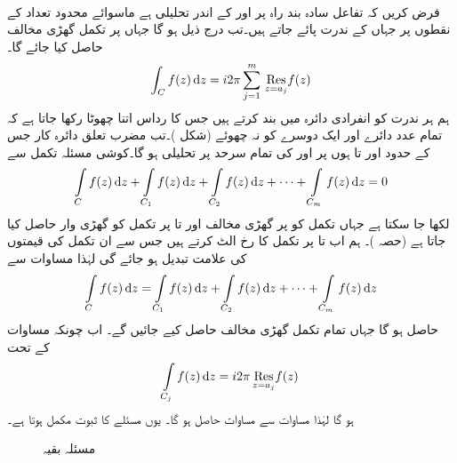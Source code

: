 \quad {}\\
فرض کریں کہ تفاعل  سادہ بند راہ  پر اور  کے اندر  تحلیلی ہے ماسوائے محدود تعداد کے نقطوں  پر جہاں  کے ندرت پائے جاتے ہیں۔تب درج ذیل ہو گا جہاں  پر تکمل گھڑی مخالف  حاصل کیا جائے گا۔
\begin{align}\label{مساوات_بقیہ_مسئلہ_بقیہ_الف}
\int_C f(z)\dif z=i2\pi\sum\limits_{j=1}^{m} \,\underset{z=a_j}{\Res} f(z)
\end{align} 
\quad
ہم ہر ندرت  کو انفرادی دائرہ  میں بند کرتے ہیں جس کا رداس اتنا چھوٹا رکھا جاتا ہے کہ تمام  عدد دائرے اور  ایک دوسرے کو نہ چھوئے (شکل )۔تب مضرب تعلق دائرہ کار  جس کے حدود  اور  تا  ہوں پر اور  کی تمام سرحد پر  تحلیلی ہو گا۔کوشی مسئلہ تکمل سے 
\begin{align}\label{مساوات_بقیہ_مسئلہ_بقیہ_ب}
\int\limits_C f(z)\dif z+\int\limits_{C_1} f(z)\dif z+\int\limits_{C_2} f(z)\dif z+\cdots+\int\limits_{C_m} f(z)\dif z=0
\end{align}
لکھا جا سکتا ہے جہاں تکمل کو  پر گھڑی مخالف اور  تا  پر تکمل کو گھڑی وار حاصل کیا جاتا ہے (حصہ )۔ ہم اب  تا  پر تکمل کا رخ الٹ کرتے ہیں جس سے ان تکمل کی قیمتوں کی علامت تبدیل ہو جائے گی لہٰذا مساوات  سے 
\begin{align}\label{مساوات_بقیہ_مسئلہ_بقیہ_پ}
\int\limits_C f(z)\dif z=\int\limits_{C_1} f(z)\dif z+\int\limits_{C_2} f(z)\dif z+\cdots+\int\limits_{C_m} f(z)\dif z
\end{align}
حاصل ہو گا جہاں تمام تکمل گھڑی مخالف حاصل کیے جائیں گے۔ اب چونکہ مساوات  کے تحت
\begin{align*}
\int\limits_{C_j} f(z)\dif z=i2\pi \,\underset{z=a_j\hfill}{\Res} f(z)
\end{align*}
ہو گا لہٰذا مساوات  سے مساوات  حاصل ہو گا۔ یوں مسئلے کا ثبوت مکمل ہوتا ہے۔
\begin{figure}
\centering
{}
\caption{مسئلہ بقیہ}
\label{شکل_بقیہ_مسئلہ_بقیہ}
\end{figure}


